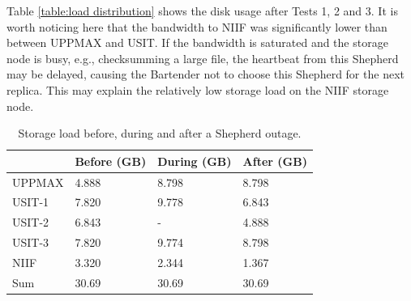 \documentclass{llncs}
\begin{document}
Table \ref{table:load distribution} shows the disk usage after Tests
1, 2 and 3. It is worth noticing here that the bandwidth to NIIF was
significantly lower than between UPPMAX and USIT. If the bandwidth is
saturated and the storage node is busy, e.g., checksumming a
large file, the heartbeat from this Shepherd may be delayed, causing the
Bartender not to choose this Shepherd for the next replica. This may explain the
relatively low storage load on the  NIIF storage node.


\begin{table}[ht]
\centering
\begin{tabular}[width = \columnwidth]{llll}
\hline \hline
&\small{Before (GB)}&\small{During (GB)}&\small{After (GB)}\\
\hline
\small{UPPMAX}&4.888&8.798&8.798\\
\small{USIT-1}&7.820&9.778&6.843\\
\small{USIT-2}&6.843&-    &4.888\\
\small{USIT-3}&7.820&9.774&8.798\\
\small{NIIF}  &3.320&2.344&1.367\\
\hline
\small{Sum}&30.69&30.69&30.69\\
\hline
\end{tabular}
\caption{Storage load before, during and after a Shepherd outage.}
\label{table:self healing}  
\end{table}      
\end{document}
